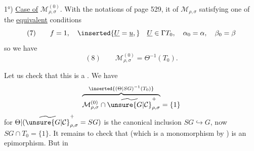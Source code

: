 1°) \uline{Case of} $\mathcal M_{\rho,\sigma}^{(0)}$. With the notations
of page 529, it  
 of $\mathcal M_{\rho,\sigma}$ satisfying one of the
\uline{equivalent} conditions
\[
(7)\qquad f=1,\quad\inserted{\underline U=\underline u,}\quad
\underline U\in\Gamma T_0,\quad \alpha_0=\alpha,\quad\beta_0=\beta
\]
so we have
\[
(8)\qquad \mathcal M_{\rho,\sigma}^{(0)}=\Theta^{-1}(T_0).
\]

Let us check that this is a .
We have
\[
\overbrace{\mathcal M_{\rho,\sigma}^{(0)}\cap\widetilde{\unsure{G|\mathcal C}}_{\rho,\sigma}^{+}}
^{\inserted{(\Theta|SG)^{-1}(T_0)}}=\{1\}
\]
for $\Theta|(\widetilde{\unsure{G|\mathcal C}}_{\rho,\sigma}^{+}=SG)$ is the canonical
inclusion $SG\hookrightarrow G$, now $SG\cap T_0=\{1\}$.
It remains to check that
(which is a monomorphism by ) is an epimorphism. But in



